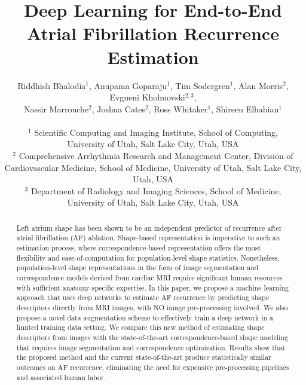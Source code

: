 \documentclass[twocolumn]{cinc}
\begin{document}


\title{Deep Learning for End-to-End Atrial Fibrillation Recurrence Estimation}


\author{ Riddhish Bhalodia$^1$, Anupama Goparaju$^1$, Tim Sodergren$^1$, Alan Morris$^2$, Evgueni Kholmovski$^{2,3}$,\\
	Nassir Marrouche$^2$, Joshua Cates$^2$, Ross Whitaker$^1$, Shireen Elhabian$^1$ \\
\ \\ %
$^1$ Scientific Computing and Imaging Institute, School of Computing, \\ 
University of Utah, Salt Lake City, Utah, USA
 \\
$^2$ Comprehensive Arrhythmia Research and Management Center, Division of
 Cardiovascular Medicine, School of Medicine, University of Utah, Salt Lake City, Utah, USA
\\
$^3$ Department of Radiology and Imaging Sciences, School of Medicine, \\ University of Utah, Salt Lake City, Utah, USA
 } %
\maketitle

\begin{abstract}
Left atrium shape has been shown to be an independent predictor of recurrence after atrial fibrillation (AF) ablation. Shape-based representation is imperative to such an estimation process, where correspondence-based representation offers the most flexibility and ease-of-computation for population-level shape statistics.
Nonetheless, population-level shape representations in the form of image segmentation and correspondence models derived from cardiac MRI require significant human resources with sufficient anatomy-specific expertise. 
In this paper, we propose a machine learning approach that uses deep networks to estimate AF recurrence by predicting shape descriptors directly from MRI images, with NO image pre-processing involved. 
We also propose a novel data augmentation scheme to effectively train a deep network in a limited training data setting. 
We compare this new method of estimating shape descriptors from images with the state-of-the-art correspondence-based shape modeling that requires image segmentation and correspondence optimization. %
Results show that the proposed method and the current state-of-the-art produce statistically similar outcomes on AF recurrence, eliminating the need for expensive pre-processing pipelines and associated  human labor. 
\end{abstract}
\vspace{-0.3in}
\end{document}
